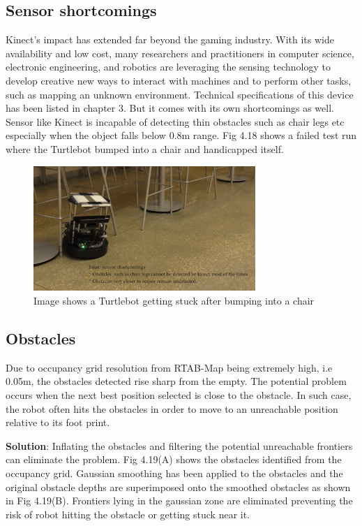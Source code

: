 \subsection{Sensor shortcomings}
Kinect’s impact has extended far beyond the gaming industry\cite{24}. With its wide availability and low cost, many researchers and practitioners in computer science, electronic engineering, and robotics are leveraging the sensing technology to develop creative new ways to interact with machines and to perform other tasks, such as mapping an unknown environment. Technical specifications of this device has been listed in chapter 3. But it comes with its own shortcomings as well. Sensor like Kinect is incapable of detecting thin obstacles such as chair legs etc especially when the object falls below 0.8m range. Fig 4.18 shows a failed test run where the Turtlebot bumped into a chair and handicapped itself.

\begin{figure}[!h]
\centering
	\includegraphics[width=0.75\textwidth]{images/chairleg.png}
\caption{Image shows a Turtlebot getting stuck after bumping into a chair}
\end{figure}

\subsection{Obstacles}
Due to occupancy grid resolution from RTAB-Map being extremely high, i.e 0.05m, the obstacles detected rise sharp from the empty. The potential problem occurs when the next best position selected is close to the obstacle. In such case, the robot often hits the obstacles in order to move to an unreachable position relative to its foot print. 

\textbf{Solution}: Inflating the obstacles and filtering the potential unreachable frontiers can eliminate the problem. Fig 4.19(A) shows the obstacles identified from the occupancy grid. Gaussian smoothing has been applied to the obstacles and the original obstacle depths are superimposed onto the smoothed obstacles as shown in Fig 4.19(B). Frontiers lying in the gaussian zone are eliminated preventing the risk of robot hitting the obstacle or getting stuck near it.

